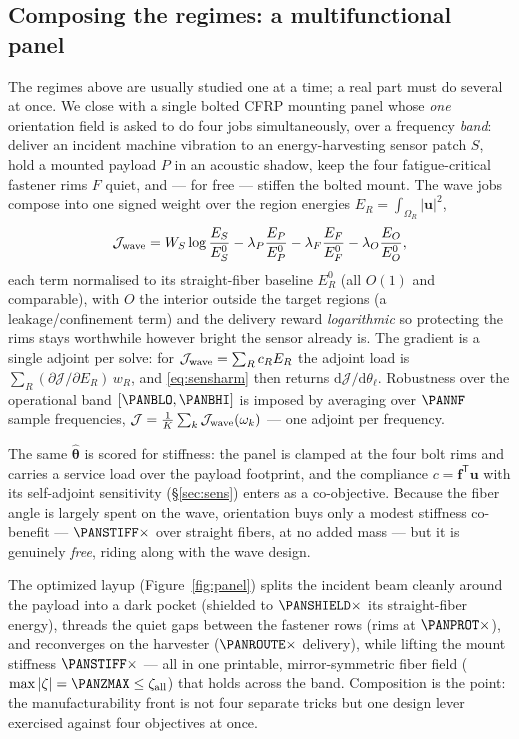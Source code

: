 \documentclass[preprint,11pt]{elsarticle}
\newcommand{\vu}{\mathbf{u}}
\newcommand{\vf}{\mathbf{f}}
\newcommand{\Tp}{^{\mathsf{T}}}
\newcommand{\rmd}{\mathrm{d}}
\newcommand{\zall}{\zeta_{\mathrm{all}}}
\theoremstyle{plain}\newtheorem{proposition}{Proposition}
\theoremstyle{remark}\newtheorem{remark}{Remark}
\begin{document}
\subsection{Composing the regimes: a multifunctional panel}
\label{sec:panel}
The regimes above are usually studied one at a time; a real part must do several at
once. We close with a single bolted CFRP mounting panel whose \emph{one} orientation
field is asked to do four jobs simultaneously, over a frequency \emph{band}: deliver an
incident machine vibration to an energy-harvesting sensor patch $S$, hold a mounted
payload $P$ in an acoustic shadow, keep the four fatigue-critical fastener rims $F$
quiet, and --- for free --- stiffen the bolted mount. The wave jobs compose into one
signed weight over the region energies $E_R=\int_{\Omega_R}|\vu|^2$,
\begin{equation}
  \mathcal J_{\rm wave}=W_S\log\frac{E_S}{E_S^0}
  -\lambda_P\frac{E_P}{E_P^0}-\lambda_F\frac{E_F}{E_F^0}-\lambda_O\frac{E_O}{E_O^0},
  \label{eq:panel}
\end{equation}
each term normalised to its straight-fiber baseline $E_R^0$ (all $O(1)$ and comparable),
with $O$ the interior outside the target regions (a leakage/confinement term) and the
delivery reward \emph{logarithmic} so protecting the rims stays worthwhile however
bright the sensor already is. The gradient is a single adjoint per solve: for
$\mathcal J_{\rm wave}=\sum_R c_R E_R$ the adjoint load is
$\sum_R(\partial\mathcal J/\partial E_R)\,w_R$, and \eqref{eq:sensharm} then returns
$\rmd\mathcal J/\rmd\theta_\ell$. Robustness over the operational band
$[\PANBLO,\PANBHI]$ is imposed by averaging over $\PANNF$ sample frequencies,
$\mathcal J=\tfrac1K\sum_k\mathcal J_{\rm wave}(\omega_k)$ --- one adjoint per frequency.

The same $\hat{\bm\theta}$ is scored for stiffness: the panel is clamped at the four
bolt rims and carries a service load over the payload footprint, and the compliance
$c=\vf\Tp\vu$ with its self-adjoint sensitivity (\S\ref{sec:sens}) enters as a
co-objective. Because the fiber angle is largely spent on the wave, orientation buys
only a modest stiffness co-benefit --- $\PANSTIFF\times$ over straight fibers, at no
added mass --- but it is genuinely \emph{free}, riding along with the wave design.

The optimized layup (Figure~\ref{fig:panel}) splits the incident beam cleanly around
the payload into a dark pocket (shielded to $\PANSHIELD\times$ its straight-fiber
energy), threads the quiet gaps between the fastener rows (rims at $\PANPROT\times$),
and reconverges on the harvester ($\PANROUTE\times$ delivery), while lifting the mount
stiffness $\PANSTIFF\times$ --- all in one printable, mirror-symmetric fiber field
($\max|\zeta|=\PANZMAX\le\zall$) that holds across the band. Composition is the point:
the manufacturability front is not four separate tricks but one design lever exercised
against four objectives at once.
\end{document}
